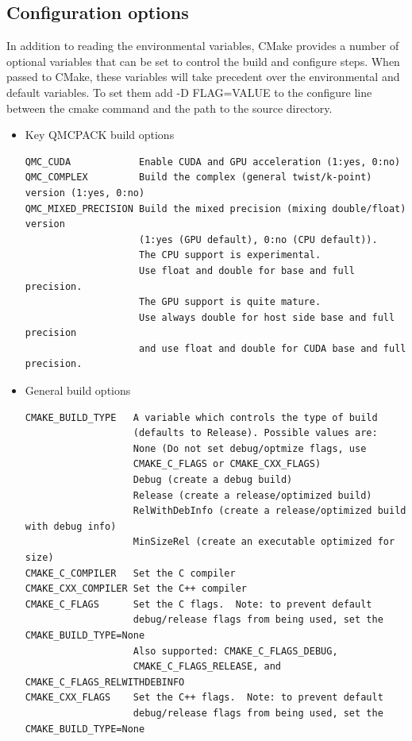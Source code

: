 \subsection{Configuration options}
\label{sec:cmakeoptions}
In addition to reading the environmental variables, CMake provides a
number of optional variables that can be set to control the build and
configure steps.  When passed to CMake, these variables will take
precedent over the environmental and default variables.  To set them
add -D FLAG=VALUE to the configure line between the cmake command and
the path to the source directory.

\begin{itemize}
\item  Key QMCPACK build options
\begin{verbatim}
QMC_CUDA            Enable CUDA and GPU acceleration (1:yes, 0:no)
QMC_COMPLEX         Build the complex (general twist/k-point) version (1:yes, 0:no)
QMC_MIXED_PRECISION Build the mixed precision (mixing double/float) version
                    (1:yes (GPU default), 0:no (CPU default)).
                    The CPU support is experimental.
                    Use float and double for base and full precision.
                    The GPU support is quite mature.
                    Use always double for host side base and full precision
                    and use float and double for CUDA base and full precision.
\end{verbatim}
  \item General build options
\begin{verbatim}
CMAKE_BUILD_TYPE   A variable which controls the type of build
                   (defaults to Release). Possible values are:
                   None (Do not set debug/optmize flags, use
                   CMAKE_C_FLAGS or CMAKE_CXX_FLAGS)
                   Debug (create a debug build)
                   Release (create a release/optimized build)
                   RelWithDebInfo (create a release/optimized build with debug info)
                   MinSizeRel (create an executable optimized for size)
CMAKE_C_COMPILER   Set the C compiler
CMAKE_CXX_COMPILER Set the C++ compiler
CMAKE_C_FLAGS      Set the C flags.  Note: to prevent default
                   debug/release flags from being used, set the CMAKE_BUILD_TYPE=None
                   Also supported: CMAKE_C_FLAGS_DEBUG,
                   CMAKE_C_FLAGS_RELEASE, and CMAKE_C_FLAGS_RELWITHDEBINFO
CMAKE_CXX_FLAGS    Set the C++ flags.  Note: to prevent default
                   debug/release flags from being used, set the CMAKE_BUILD_TYPE=None

\end{verbatim}
\end{itemize}
